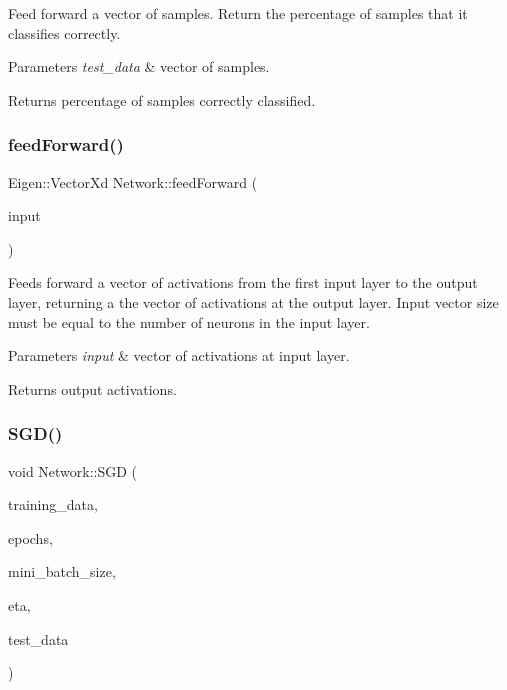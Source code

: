 Feed forward a vector of samples. Return the percentage of samples that it classifies correctly.


\begin{DoxyParams}{Parameters}
{\em test\+\_\+data} & vector of samples. \\
\hline
\end{DoxyParams}
\begin{DoxyReturn}{Returns}
percentage of samples correctly classified. 
\end{DoxyReturn}
\mbox{\label{classNetwork_a4fba84f6e70a7c89fff90091efd51679}} 
\subsubsection{\texorpdfstring{feed\+Forward()}{feedForward()}}
{\footnotesize\ttfamily Eigen\+::\+Vector\+Xd Network\+::feed\+Forward (\begin{DoxyParamCaption}\item[{Eigen\+::\+Vector\+Xd \&}]{input }\end{DoxyParamCaption})}

Feeds forward a vector of activations from the first input layer to the output layer, returning a the vector of activations at the output layer. Input vector size must be equal to the number of neurons in the input layer.


\begin{DoxyParams}{Parameters}
{\em input} & vector of activations at input layer. \\
\hline
\end{DoxyParams}
\begin{DoxyReturn}{Returns}
output activations. 
\end{DoxyReturn}
\mbox{\label{classNetwork_acdb38726769a9f571f09a5f10f6b6847}} 
\subsubsection{\texorpdfstring{S\+G\+D()}{SGD()}}
{\footnotesize\ttfamily void Network\+::\+S\+GD (\begin{DoxyParamCaption}\item[{std\+::vector$<$ sample $>$ \&}]{training\+\_\+data,  }\item[{int}]{epochs,  }\item[{int}]{mini\+\_\+batch\+\_\+size,  }\item[{int}]{eta,  }\item[{std\+::vector$<$ sample $>$ \&}]{test\+\_\+data }\end{DoxyParamCaption})}

